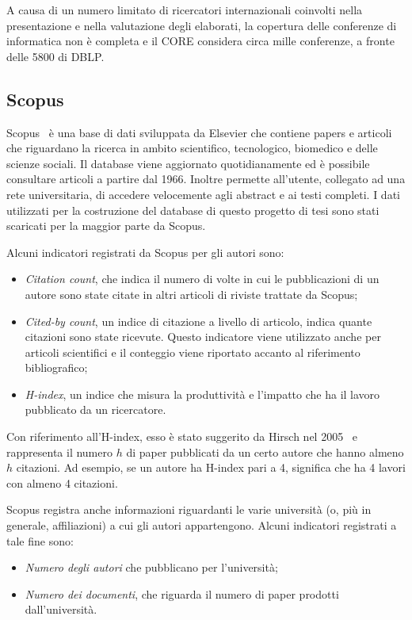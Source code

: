 A causa di un numero limitato di ricercatori internazionali coinvolti nella presentazione e nella valutazione degli elaborati, la copertura delle conferenze di informatica non è completa e il CORE considera circa mille conferenze, a fronte delle 5800 di DBLP.


\subsection{Scopus}\label{sec:scopus}

Scopus~\cite{scopus} è una base di dati sviluppata da Elsevier che contiene
papers e articoli che riguardano la ricerca in ambito scientifico, tecnologico,
biomedico e delle scienze sociali. Il database viene aggiornato quotidianamente
ed è possibile consultare articoli a partire dal 1966. Inoltre permette
all'utente, collegato ad una rete universitaria, di accedere velocemente agli
abstract e ai testi completi.
I dati utilizzati per la costruzione del database di questo progetto di tesi sono stati scaricati per la maggior parte da Scopus. 

Alcuni indicatori registrati da Scopus per gli autori sono:
\begin{itemize}
    \item \textit{Citation count}, che indica il numero di volte in cui le
    pubblicazioni di un autore sono state citate in altri articoli di riviste
    trattate da Scopus;
    \item \textit{Cited-by count}, un indice di citazione a livello di articolo,
    indica quante citazioni sono state ricevute. Questo indicatore viene
    utilizzato anche per articoli scientifici e il conteggio viene riportato
    accanto al riferimento bibliografico;
    \item \textit{H-index}, un indice che misura la produttività e l'impatto che
    ha il lavoro pubblicato da un ricercatore.
\end{itemize}

Con riferimento all'H-index, esso è stato suggerito da Hirsch nel 2005~\cite{hirsch2005}
e rappresenta il numero $h$ di paper pubblicati da un certo autore che hanno
almeno $h$ citazioni. Ad esempio, se un autore ha H-index pari a 4, significa
che ha 4 lavori con almeno 4 citazioni.

Scopus registra anche informazioni riguardanti le varie università (o, più
in generale, affiliazioni) a cui gli autori appartengono. Alcuni indicatori
registrati a tale fine sono:
\begin{itemize}
    \item \textit{Numero degli autori} che pubblicano per l'università;
    \item \textit{Numero dei documenti}, che riguarda il numero di paper prodotti dall'università.
\end{itemize}


